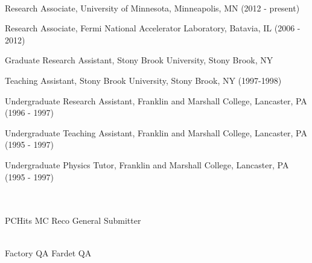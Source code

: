 \documentclass[amsmath,amssymb]{revtex4}
\begin{document}
 \\
\begin{list}{}
            {\setlength{\itemsep}{0.0in}\setlength{\parsep}{0.0in}
             \addtolength{\parskip}{-0.5in}}
\item Research Associate, University of Minnesota, Minneapolis, MN (2012 - present)
\item Research Associate, Fermi National Accelerator Laboratory, Batavia, IL (2006 - 2012)
\item Graduate Research Assistant, Stony Brook University, Stony Brook, NY %
\item Teaching Assistant, Stony Brook University, Stony Brook, NY (1997-1998) %
\item Undergraduate Research Assistant, Franklin and Marshall College, Lancaster, PA (1996 - 1997)
\item Undergraduate Teaching Assistant, Franklin and Marshall College, Lancaster, PA (1995 - 1997)
\item Undergraduate Physics Tutor, Franklin and Marshall College, Lancaster, PA (1995 - 1997)
\end{list}
\vspace{\baselineskip}



{} \\

 \\
PCHits
MC Reco
General Submitter

 \\
Factory QA
Fardet QA
\end{document}
